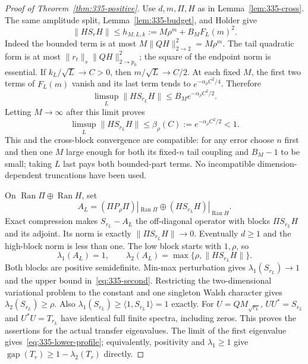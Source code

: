 \documentclass[11pt]{article}
\newcommand{\gap}{\operatorname{gap}}
\begin{document}
\begin{proof}[Proof of Theorem~\ref{thm:335-positive}]
Use $d,m,\Pi,H$ as in Lemma~\ref{lem:335-cross}. The same amplitude
split, Lemma~\ref{lem:335-budget}, and Holder give
\begin{equation}\label{eq:335-high}
 \|HS_rH\|\le h_{M,L,k}:=M\rho^m+B_MF_L(m)^2.
\end{equation}
Indeed the bounded term is at most $M\|QH\|_{2\to2}^2=M\rho^m$.
The tail quadratic form is at most
$\|r_t\|_s\|QH\|_{2\to p_0}^2$; the square of the endpoint norm
is essential. If $k_L/\sqrt L\to C>0$, then $m/\sqrt L\to C/2$.
At each fixed $M$, the first two terms of $F_L(m)$ vanish and its last
term tends to $e^{-\alpha_\rho C^2/4}$. Therefore
\[
 \limsup_L\|HS_{r_L}H\|\le B_Me^{-\alpha_\rho C^2/2}.
\]
Letting $M\to\infty$ after this limit proves
\begin{equation}\label{eq:335-beta}
 \limsup_L\|HS_{r_L}H\|\le\beta_\rho(C)
 :=e^{-\alpha_\rho C^2/2}<1.
\end{equation}
This and the cross-block convergence are compatible: for any error choose
$n$ first and then one $M$ large enough for both its fixed-$n$ tail
coupling and $B_M-1$ to be small; taking $L$ last pays both bounded-part
terms. No incompatible dimension-dependent truncations have been used.

On $\operatorname{Ran}\Pi\oplus\operatorname{Ran}H$, set
\[
 A_L=(\Pi P_\rho\Pi)|_{\operatorname{Ran}\Pi}
       \oplus(HS_{r_L}H)|_{\operatorname{Ran}H}.
\]
Exact compression makes $S_{r_L}-A_L$ the off-diagonal operator with
blocks $\Pi S_{r_L}H$ and its adjoint. Its norm is exactly
$\|\Pi S_{r_L}H\|\to0$. Eventually $d\ge1$ and the high-block
norm is less than one. The low block starts with $1,\rho$, so
\[
 \lambda_1(A_L)=1,\qquad
 \lambda_2(A_L)=\max\{\rho,\|HS_{r_L}H\|\}.
\]
Both blocks are positive semidefinite. Min-max perturbation gives
$\lambda_1(S_{r_L})\to1$ and the upper bound in~\eqref{eq:335-second}.
Restricting the two-dimensional variational problem to the constant and
one singleton Walsh character gives $\lambda_2(S_{r_L})\ge\rho$.
Also $\lambda_1(S_{r_L})\ge\langle1,S_{r_L}1\rangle=1$ exactly.
For $U=QM_{\sqrt{r_L}}$, $UU^*=S_{r_L}$ and $U^*U=T_{r_L}$ have
identical full finite spectra, including zeros. This proves the assertions
for the actual transfer eigenvalues. The limit of the first eigenvalue
gives~\eqref{eq:335-lower-profile}; equivalently, positivity and
$\lambda_1\ge1$ give $\gap(T_r)\ge1-\lambda_2(T_r)$ directly.


\end{proof}
\end{document}
